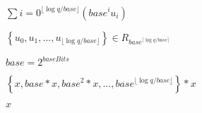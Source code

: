 \documentclass{article}
\begin{document}
$ \sum\limits{i=0}^{\lfloor {\log q/base} \rfloor} {(base^i u_i)} $
\pagebreak

$ \left\{u_0, u_1,...,u_{\lfloor {\log q/base} \rfloor} \right\} \in R_{{base}^{\lceil {\log q/base} \rceil}} $
\pagebreak

$ base = 2^{baseBits} $
\pagebreak

$ \left\{x, {base}*x, {base}^2*x, ..., {base}^{\lfloor {\log q/{base}} \rfloor} \right\}*x $
\pagebreak

$ x $
\pagebreak
\end{document}
